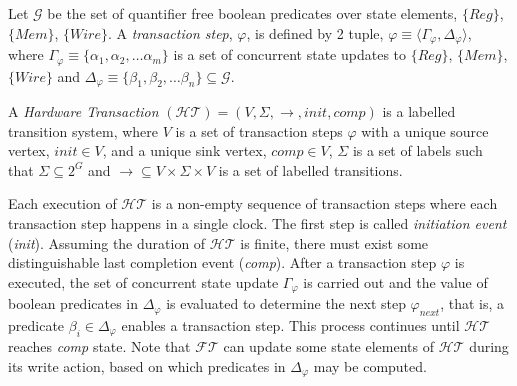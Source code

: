 \documentclass[sigconf]{acmart}
\begin{document}
Let $\mathcal{G}$ be the set of quantifier free boolean predicates over 
state elements, $\{Reg\}$, $\{Mem\}$, $\{Wire\}$.  
A {\em transaction step}, $\varphi$, is defined by 2 tuple,
$\varphi \equiv \langle \Gamma_{\varphi}, \Delta_{\varphi} \rangle$, where 
$\Gamma_{\varphi} \equiv \{\alpha_1, \alpha_2, \ldots \alpha_{m}\}$
is a set of concurrent state updates to $\{Reg\}$, $\{Mem\}$, $\{Wire\}$ 
and $\Delta_{\varphi} \equiv \{\beta_1, \beta_2, \ldots \beta_{n}\} \subseteq
\mathcal{G}$.

A {\em Hardware Transaction} $(\mathcal{HT}) = (V, \Sigma, \rightarrow, init,
comp)$ is a labelled transition system, where $V$ is a set of transaction steps
$\varphi$ with a unique source vertex, $init \in V$, and a unique sink vertex, 
$comp \in V$, $\Sigma$ is a set of labels such that $\Sigma \subseteq 2^{G}$ and  
$\rightarrow \subseteq V \times \Sigma \times V$ is a set of labelled
transitions.

Each execution of $\mathcal{HT}$ is a non-empty 
sequence of transaction steps where each transaction step 
happens in a single clock. The first step is called {\em initiation event}
(\textit{init}). Assuming the duration of $\mathcal{HT}$ is finite, 
there must exist some distinguishable last completion event (\textit{comp}). 
After a transaction step $\varphi$ is executed, the set of concurrent state
update $\Gamma_{\varphi}$ is carried out and the value of boolean predicates
in $\Delta_{\varphi}$ is evaluated to determine the next step
$\varphi_{next}$, that is, a predicate $\beta_i \in \Delta_{\varphi}$
enables a transaction step.  This process continues until $\mathcal{HT}$
reaches \textit{comp} state.  Note that $\mathcal{FT}$ can update some state
elements of $\mathcal{HT}$ during its write action, based on which
predicates in $\Delta_{\varphi}$ may be computed. 
\end{document}
